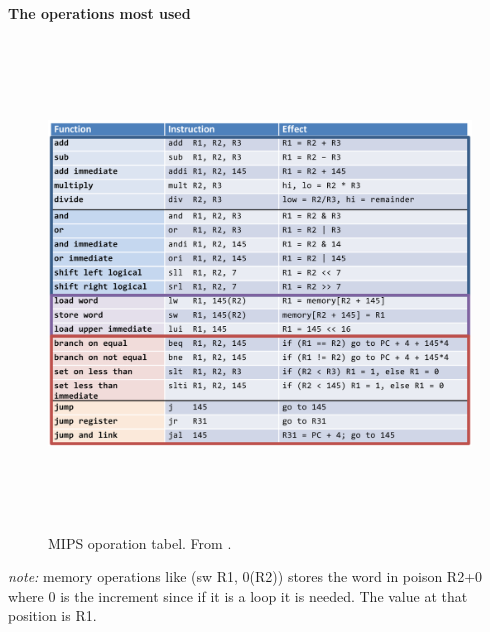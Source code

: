 \noindent\textbf{The operations most used} \newline
\begin{figure}[h]
    \vspace{10mm}
    \centering
    \includegraphics[width=16cm, height=13cm]{image/mips-tabel.png} 
    \caption{MIPS oporation tabel. From \cite{computer_architecture_book}.}
    \label{mips-tabel}
\end{figure}

\emph{note:} memory operations like (sw R1, 0(R2)) stores the word in poison R2+0 where 0 is the increment
since if it is a loop it is needed. The value at that position is R1. 

\newpage

